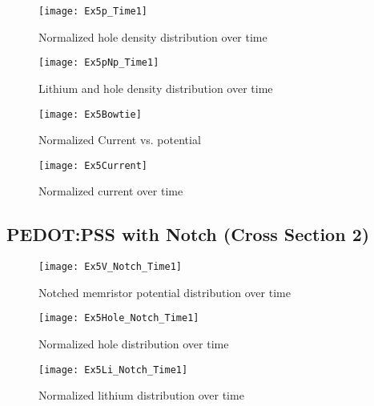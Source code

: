 \begin{landscape}
\begin{figure}[!htp]
\centering
\texttt{[image: Ex5p\_Time1]}
\caption{Normalized hole density distribution over time} 
\label{}
\end{figure}
\end{landscape}

\begin{landscape}
\begin{figure}[!htp]
\centering
\texttt{[image: Ex5pNp\_Time1]}
\caption{Lithium and hole density distribution over time} 
\label{}
\end{figure}
\end{landscape}



\begin{figure}[!htp]
\centering
\texttt{[image: Ex5Bowtie]}
\caption{Normalized Current vs. potential} 
\label{}
\end{figure}

\begin{figure}[!htp]
\centering
\texttt{[image: Ex5Current]}
\caption{Normalized current over time} 
\label{}
\end{figure}



\clearpage
\subsection{PEDOT:PSS with Notch (Cross Section 2)}


\begin{landscape}
\begin{figure}[!htp]
\centering
\texttt{[image: Ex5V\_Notch\_Time1]}
\caption{Notched memristor potential distribution over time} 
\label{}
\end{figure}
\end{landscape}



\begin{landscape}
\begin{figure}[!htp]
\centering
\texttt{[image: Ex5Hole\_Notch\_Time1]}
\caption{Normalized hole distribution over time} 
\label{}
\end{figure}
\end{landscape}


\begin{landscape}
\begin{figure}[!htp]
\centering
\texttt{[image: Ex5Li\_Notch\_Time1]}
\caption{Normalized lithium distribution over time} 
\label{}
\end{figure}
\end{landscape}


